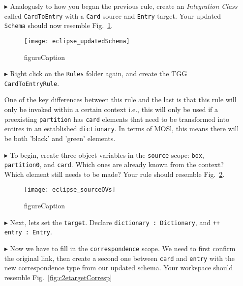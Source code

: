 \begin{itemize} 

\item[$\blacktriangleright$] Analogusly to how you began the previous rule, create an \emph{Integration Class} called \texttt{CardToEntry} with a \texttt{Card}
source and \texttt{Entry} target. Your updated \texttt{Schema} should now resemble Fig.~\ref{fig:updatedSchema}.

\begin{figure}[htbp]
\begin{center}
  \texttt{[image: eclipse\_updatedSchema]}
  \caption{figureCaption}
  \label{fig:updatedSchema}
\end{center}
\end{figure}

\item[$\blacktriangleright$] Right click on the \texttt{Rules} folder again, and create the TGG \texttt{CardToEntryRule}.

One of the key differences between this rule and the last is that this rule will only be invoked within a certain context i.e.,
this will only be used if a preexisting \texttt{partition} has \texttt{card} elements that need to be transformed into entires in an established
\texttt{dictionary}. In terms of MOSl, this means there will be both 'black' and 'green' elements.

\item[$\blacktriangleright$] To begin, create three object variables in the \texttt{source} scope: \texttt{box}, \texttt{partition0}, and \texttt{card}. Which
ones are already known from the context? Which element still needs to be made? Your rule should resemble Fig.~\ref{fig:c2eRuleSource}.

\begin{figure}[htbp]
\begin{center}
  \texttt{[image: eclipse\_sourceOVs]}
  \caption{figureCaption}
  \label{fig:c2eRuleSource}
\end{center}
\end{figure}

\item[$\blacktriangleright$] Next, lets set the \texttt{target}. Declare \texttt{dictionary : Dictionary}, and \texttt{++ entry : Entry}.

\item[$\blacktriangleright$] Now we have to fill in the \texttt{correspondence} scope. We need to first confirm the original link, then create a second one
between \texttt{card} and \texttt{entry} with the new correspondence type from our updated schema. Your workspace should resemble Fig.~\ref{fig:c2etargetCorresp}


\end{itemize}
